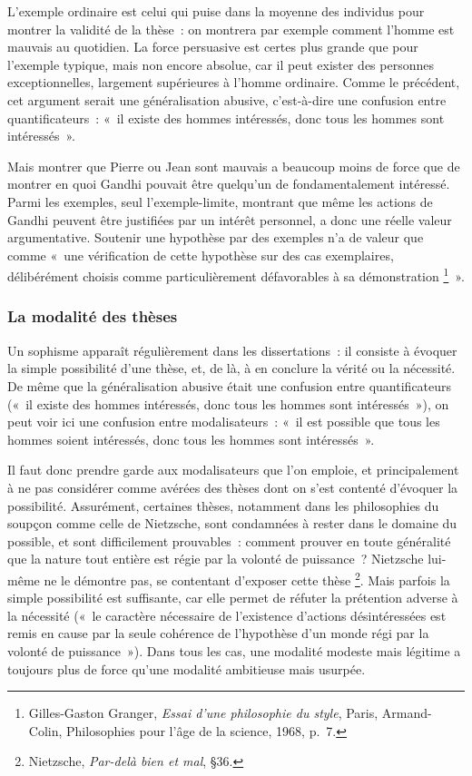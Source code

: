 \documentclass[a4paper]{article}
\begin{document}
\begin{enumerate}
   L'exemple ordinaire est celui qui puise dans la moyenne des individus
   pour montrer la validité de la thèse : on montrera par exemple
   comment l'homme est mauvais au quotidien. La force persuasive est
   certes plus grande que pour l'exemple typique, mais non encore
   absolue, car il peut exister des personnes exceptionnelles, largement
   supérieures à l'homme ordinaire. Comme le précédent, cet argument
   serait une généralisation abusive, c'est-à-dire une confusion entre
   quantificateurs : « il existe des hommes intéressés, donc tous les
   hommes sont intéressés ».
   
   Mais montrer que Pierre ou Jean sont mauvais a beaucoup moins de
   force que de montrer en quoi Gandhi pouvait être quelqu'un de
   fondamentalement intéressé. Parmi les exemples, seul
   l'exemple-limite, montrant que même les actions de Gandhi peuvent
   être justifiées par un intérêt personnel, a donc une réelle valeur
   argumentative. Soutenir une hypothèse par des exemples n'a de valeur
   que comme « une vérification de cette hypothèse sur des cas
   exemplaires, délibérément choisis comme particulièrement défavorables
   à sa démonstration \footnote{Gilles-Gaston Granger, \emph{Essai d'une philosophie du style}, Paris,
    Armand-Colin, Philosophies pour l'âge de la science, 1968, p. 7.
 } ».
\end{enumerate}
\subsubsection{La modalité des thèses}
\label{sec-3-4-3}


Un sophisme apparaît régulièrement dans les dissertations : il consiste
à évoquer la simple possibilité d'une thèse, et, de là, à en conclure la
vérité ou la nécessité. De même que la généralisation abusive était une
confusion entre quantificateurs (« il existe des hommes intéressés, donc
tous les hommes sont intéressés »), on peut voir ici une confusion entre
modalisateurs : « il est possible que tous les hommes soient intéressés,
donc tous les hommes sont intéressés ».

Il faut donc prendre garde aux modalisateurs que l'on emploie, et
principalement à ne pas considérer comme avérées des thèses dont on
s'est contenté d'évoquer la possibilité. Assurément, certaines thèses,
notamment dans les philosophies du soupçon comme celle de Nietzsche,
sont condamnées à rester dans le domaine du possible, et sont
difficilement prouvables : comment prouver en toute généralité que la
nature tout entière est régie par la volonté de puissance ? Nietzsche
lui-même ne le démontre pas, se contentant d'exposer cette thèse \footnote{Nietzsche, \emph{Par-delà bien et mal}, §36.
 }.
Mais parfois la simple possibilité est suffisante, car elle permet de
réfuter la prétention adverse à la nécessité (« le caractère nécessaire
de l'existence d'actions désintéressées est remis en cause par la seule
cohérence de l'hypothèse d'un monde régi par la volonté de puissance »).
Dans tous les cas, une modalité modeste mais légitime a toujours plus de
force qu'une modalité ambitieuse mais usurpée.
\end{document}
